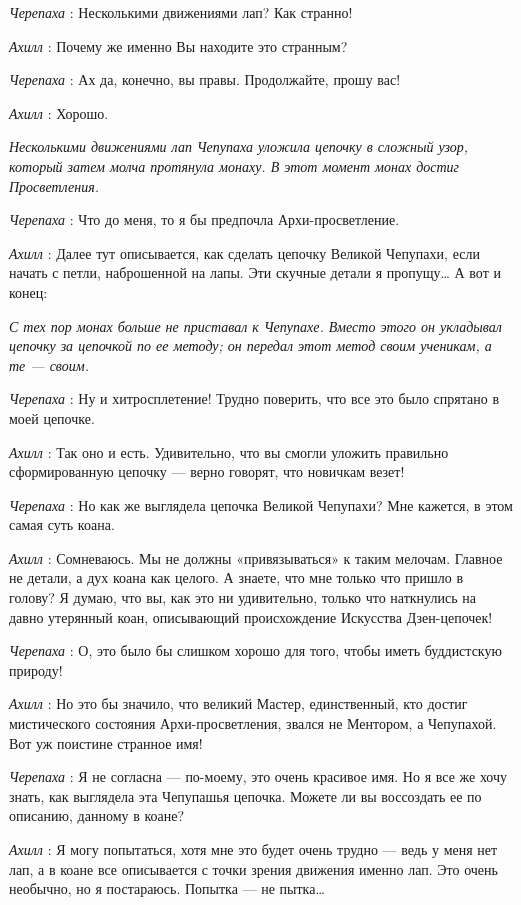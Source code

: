 \emph{Черепаха} : Несколькими движениями лап? Как странно!

\emph{Ахилл} : Почему же именно Вы находите это странным?

\emph{Черепаха} : Ах да, конечно, вы правы. Продолжайте, прошу вас!

\emph{Ахилл} : Хорошо.

\emph{Несколькими движениями лап Чепупаха уложила цепочку в сложный узор, который затем молча протянула монаху. В этот момент монах достиг Просветления.}

\emph{Черепаха} : Что до меня, то я бы предпочла Архи-просветление.

\emph{Ахилл} : Далее тут описывается, как сделать цепочку Великой Чепупахи, если начать с петли, наброшенной на лапы. Эти скучные детали я пропущу\ldots{} А вот и конец:

\emph{С тех пор монах больше не приставал к Чепупахе. Вместо этого он укладывал цепочку за цепочкой по ее методу; он передал этот метод своим ученикам, а те --- своим.}

\emph{Черепаха} : Ну и хитросплетение! Трудно поверить, что все это было спрятано в моей цепочке.

\emph{Ахилл} : Так оно и есть. Удивительно, что вы смогли уложить правильно сформированную цепочку --- верно говорят, что новичкам везет!

\emph{Черепаха} : Но как же выглядела цепочка Великой Чепупахи? Мне кажется, в этом самая суть коана.

\emph{Ахилл} : Сомневаюсь. Мы не должны «привязываться» к таким мелочам. Главное не детали, а дух коана как целого. А знаете, что мне только что пришло в голову? Я думаю, что вы, как это ни удивительно, только что наткнулись на давно утерянный коан, описывающий происхождение Искусства Дзен-цепочек!

\emph{Черепаха} : О, это было бы слишком хорошо для того, чтобы иметь буддистскую природу!

\emph{Ахилл} : Но это бы значило, что великий Мастер, единственный, кто достиг мистического состояния Архи-просветления, звался не Ментором, а Чепупахой. Вот уж поистине странное имя!

\emph{Черепаха} : Я не согласна --- по-моему, это очень красивое имя. Но я все же хочу знать, как выглядела эта Чепупашья цепочка. Можете ли вы воссоздать ее по описанию, данному в коане?

\emph{Ахилл} : Я могу попытаться, хотя мне это будет очень трудно --- ведь у меня нет лап, а в коане все описывается с точки зрения движения именно лап. Это очень необычно, но я постараюсь. Попытка --- не пытка\ldots{}

